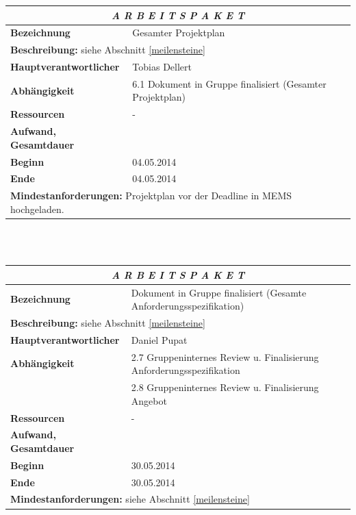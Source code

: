 \documentclass[fontsize=12pt,paper=a4,twoside]{scrartcl}
\begin{document}
\begin{tabular}{p{7.5cm}|p{7.5cm}}\toprule
\multicolumn{2}{c}{\textbf{\textit{A R B E I T S P A K E T \quad 6.2}}} \\ \toprule \hline
\textbf{Bezeichnung} & Gesamter Projektplan\\\hline
\multicolumn{2}{p{15cm}}{\textbf{Beschreibung:} \newline 
siehe Abschnitt \ref{meilensteine} }  \\\hline
\textbf{Hauptverantwortlicher} & Tobias Dellert \\\hline
\textbf{Abhängigkeit} & 6.1 Dokument in Gruppe finalisiert (Gesamter Projektplan)\\\hline
\textbf{Ressourcen} & -\\\hline
\textbf{Aufwand, Gesamtdauer} & \\\hline
\textbf{Beginn} & 04.05.2014 \\\hline
\textbf{Ende} & 04.05.2014\\\hline
\multicolumn{2}{p{15cm}}{\textbf{Mindestanforderungen: } \newline
Projektplan vor der Deadline in MEMS hochgeladen.}  \\ \toprule
\end{tabular} \\\\

\begin{tabular}{p{7.5cm}|p{7.5cm}}\toprule
\multicolumn{2}{c}{\textbf{\textit{A R B E I T S P A K E T \quad 6.3}}} \\ \toprule \hline
\textbf{Bezeichnung} & Dokument in Gruppe finalisiert (Gesamte Anforderungsspezifikation)\\\hline
\multicolumn{2}{p{15cm}}{\textbf{Beschreibung:} \newline 
siehe Abschnitt \ref{meilensteine} }  \\\hline
\textbf{Hauptverantwortlicher} & Daniel Pupat \\\hline
\textbf{Abhängigkeit} & 2.7 Gruppeninternes Review u. Finalisierung Anforderungsspezifikation \\
& 2.8 Gruppeninternes Review u. Finalisierung Angebot\\\hline
\textbf{Ressourcen} & -\\\hline
\textbf{Aufwand, Gesamtdauer} & \\\hline
\textbf{Beginn} & 30.05.2014 \\\hline
\textbf{Ende} & 30.05.2014\\\hline
\multicolumn{2}{p{15cm}}{\textbf{Mindestanforderungen: } \newline
siehe Abschnitt \ref{meilensteine}}  \\ \toprule
\end{tabular} \\\\
\end{document}
